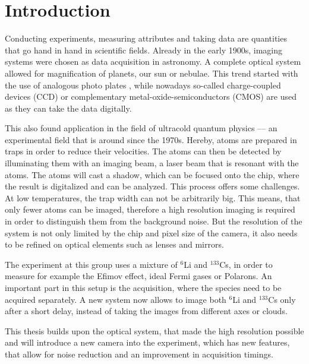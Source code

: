 \chapter{Introduction}
Conducting experiments, measuring attributes and taking data are quantities that go hand in hand in scientific fields. Already in the early 1900s, imaging systems were chosen as data acquisition in astronomy. A complete optical system allowed for magnification of planets, our sun or nebulae. This trend started with the use of analogous photo plates \cite{hdaplates}, while nowadays so-called charge-coupled devices (CCD) or complementary metal-oxide-semiconductors (CMOS) are used as they can take the data digitally.

This also found application in the field of ultracold quantum physics --- an experimental field that is around since the 1970s. Hereby, atoms are prepared in traps in order to reduce their velocities. The atoms can then be detected by illuminating them with an imaging beam, a laser beam that is resonant with the atoms. The atoms will cast a shadow, which can be focused onto the chip, where the result is digitalized and can be analyzed. This process offers some challenges. At low temperatures, the trap width can not be arbitrarily big. This means, that only fewer atoms can be imaged, therefore a high resolution imaging is required in order to distinguish them from the background noise. But the resolution of the system is not only limited by the chip and pixel size of the camera, it also needs to be refined on optical elements such as lenses and mirrors.

The experiment at this group uses a mixture of $^6$Li and $^{133}$Cs, in order to measure for example the Efimov effect, ideal Fermi gases or Polarons. An important part in this setup is the acquisition, where the species need to be acquired separately.
A new system  now allows to image both $^6$Li and $^{133}$Cs only after a short delay, instead of taking the images from different axes or clouds.

This thesis builds upon the optical system, that made the high resolution possible and will introduce a new camera into the experiment, which has new features, that allow for noise reduction and an improvement in acquisition timings.